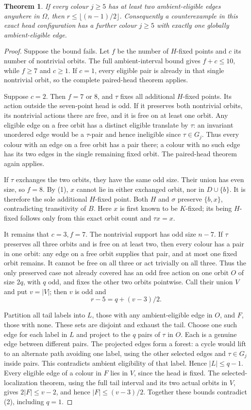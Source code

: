 \documentclass[11pt,a4paper]{article}
\newtheorem{theorem}{Theorem}
\begin{document}
\begin{theorem}
If every colour $j\ge5$ has at least two ambient-eligible edges
anywhere in $\Omega$, then $r\le\lfloor(n-1)/2\rfloor$.
Consequently a counterexample in this exact head configuration has a
further colour $j\ge5$ with exactly one globally ambient-eligible edge.
\end{theorem}
\begin{proof}
Suppose the bound fails. Let $f$ be the number of $H$-fixed points
and $c$ its number of nontrivial orbits. The full ambient-interval
bound gives $f+c\le10$, while $f\ge7$ and $c\ge1$.
If $c=1$, every eligible pair is already in that single nontrivial
orbit, so the complete paired-head theorem applies.

Suppose $c=2$. Then $f=7$ or $8$, and $\tau$ fixes all additional
$H$-fixed points. Its action outside the seven-point head is odd.
If it preserves both nontrivial orbits, its nontrivial actions there
are free, and it is free on at least one orbit. Any eligible edge on
a free orbit has a distinct eligible translate by $\tau$: an invariant
unordered edge would be a $\tau$-pair and hence ineligible since
$\tau\in G_j$. Thus every colour with an edge on a free orbit has
a pair there; a colour with no such edge has its two edges in the
single remaining fixed orbit. The paired-head theorem again applies.

If $\tau$ exchanges the two orbits, they have the same odd size.
Their union has even size, so $f=8$. By (1), $x$ cannot lie in either
exchanged orbit, nor in $D\cup\{b\}$. It is therefore the sole
additional $H$-fixed point. Both $H$ and $\sigma$ preserve
$\{b,x\}$, contradicting transitivity of $B$. Here $x$ is first
known to be $K$-fixed; its being $H$-fixed follows only from this
exact orbit count and $\tau x=x$.

It remains that $c=3,f=7$. The nontrivial support has odd size
$n-7$. If $\tau$ preserves all three orbits and is free on at least
two, then every colour has a pair in one orbit: any edge on a free
orbit supplies that pair, and at most one fixed orbit remains.
It cannot be free on all three or act trivially on all three.
Thus the only preserved case not already covered has an odd free
action on one orbit $O$ of size $2q$, with $q$ odd, and fixes the
other two orbits pointwise. Call their union $V$ and put $v=|V|$;
then $v$ is odd and
\[
                         r-5=q+(v-3)/2.                \tag{2}
\]

Partition all tail labels into $L$, those with any ambient-eligible
edge in $O$, and $F$, those with none. These sets are disjoint and
exhaust the tail. Choose one such edge for each label in $L$ and
project to the $q$ pairs of $\tau$ in $O$. Each is a genuine edge
between different pairs. The projected edges form a forest: a cycle
would lift to an alternate path avoiding one label, using the other
selected edges and $\tau\in G_j$ inside pairs. This contradicts
ambient eligibility of that label. Hence $|L|\le q-1$.
Every eligible edge of a colour in $F$ lies in $V$, since the head
is fixed. The selected-localization theorem, using the full tail
interval and its two actual orbits in $V$, gives
$2|F|\le v-2$, and hence $|F|\le(v-3)/2$.
Together these bounds contradict (2), including $q=1$.


\end{proof}
\end{document}
